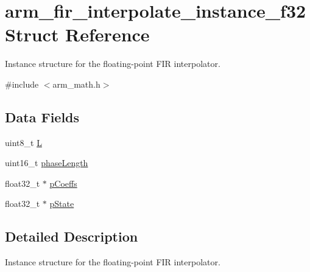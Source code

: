 \hypertarget{structarm__fir__interpolate__instance__f32}{\section{arm\-\_\-fir\-\_\-interpolate\-\_\-instance\-\_\-f32 Struct Reference}
\label{structarm__fir__interpolate__instance__f32}
}


Instance structure for the floating-\/point F\-I\-R interpolator.  




{\ttfamily \#include $<$arm\-\_\-math.\-h$>$}

\subsection*{Data Fields}
\begin{DoxyCompactItemize}
\item 
uint8\-\_\-t \hyperlink{structarm__fir__interpolate__instance__f32_aee73cc056696e504430c53eaa9c58cf0}{L}
\item 
uint16\-\_\-t \hyperlink{structarm__fir__interpolate__instance__f32_a8f92bb07e0812f94679438cdf412b26a}{phase\-Length}
\item 
float32\-\_\-t $\ast$ \hyperlink{structarm__fir__interpolate__instance__f32_aacbb8dd8eeba4b21fc2bb40076405ee3}{p\-Coeffs}
\item 
float32\-\_\-t $\ast$ \hyperlink{structarm__fir__interpolate__instance__f32_a335c87e6fdc4b96601d95a5de8b9c463}{p\-State}
\end{DoxyCompactItemize}


\subsection{Detailed Description}
Instance structure for the floating-\/point F\-I\-R interpolator. 

